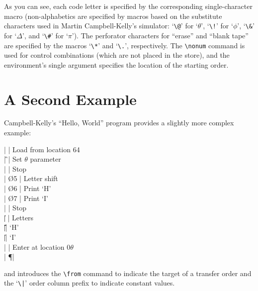 \documentclass[11pt]{article}
\begin{document}
As you can see, each code letter is specified by the corresponding
single-character
macro (non-alphabetics are specified by macros based on the substitute
characters used
in Martin Campbell-Kelly's simulator: `\verb"\@"' for `$\theta$',
`\verb"\!"' for `$\phi$', `\verb"\&"' for `$\Delta$',
and `\verb"\#"' for `$\pi$').  The perforator characters for ``erase''
and ``blank tape'' are specified by the macros `\verb"\*"' and
`\verb"\."', respectively.  The \verb"\nonum" command is used for
control combinations (which are not placed in the store), and the
environment's single argument specifies the
location of the starting order.

\section{A Second Example}
Campbell-Kelly's ``Hello, World'' program provides a slightly more
complex example:
\begin{edsac}{0}
\nonum       |    \K | Load from location 64   \\
\nonum       |   \G    \K | Set $\theta$ parameter  \\
 |   \Z    \F | Stop                    \\
             |   \O  5 \@ | Letter shift            \\
             |   \O  6 \@ | Print `H'               \\
             |   \O  7 \@ | Print `I'               \\
             |   \Z    \F | Stop                    \\
             |\| \*    \F | Letters                 \\
             |\| \H    \F | `H'                     \\
             |\| \I    \F | `I'                     \\
\nonum       |   \E    \Z | 
                              {Enter at location $0\theta$} \\
\nonum       |   \P    \F | 
\end{edsac}
and introduces the \verb"\from" command to indicate the target of a
transfer order and the `\verb"\|"' order column prefix to indicate
constant values.
\end{document}
